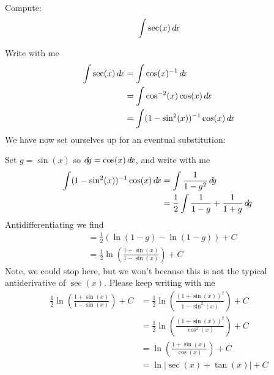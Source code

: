 \documentclass{ximera}
\begin{document}
\begin{example}
  Compute:
  \[
  \int \sec (x) \mathop{}\!d\! x
  \]
  \begin{explanation}
    Write with me
    \begin{align*}
      \int \sec(x) \d x &= \int \cos(x)^{-1} \d x\\
      &= \int \cos^{-2}(x)\cos(x) \d x\\
      &=\int(1-\sin^2(x))^{-1} \cos(x) \d x
    \end{align*}
    We have now set ourselves up for an eventual substitution:
    \begin{center}%
    \end{center}
    Set $g =\sin(x)$ so $\mathop{}\!d\! g = \cos(x) \mathop{}\!d\! x$, and write with me
    \begin{align*}
      \int(1-\sin^2(x))^{-1} \cos(x) \mathop{}\!d\! x &= \int \frac{1}{1-g^2}\mathop{}\!d\! g\\
      &= \frac{1}{2}\int \frac{1}{1-g} + \frac{1}{1+g} \mathop{}\!d\! g\
    \end{align*}
    Antidifferentiating we find
    \begin{align*}
      &=\frac{1}{2}\left(\ln(1-g) - \ln(1-g)\right)+C\\
      &= \frac{1}{2}\ln\left(\frac{1+\sin(x)}{1-\sin(x)}\right)+C
    \end{align*}
    Note, we could stop here, but we won't because this is not the
    typical antiderivative of $\sec(x)$. Please keep writing with me
    \begin{align*}
      \frac{1}{2}\ln\left(\frac{1+\sin(x)}{1-\sin(x)}\right)+C &= \frac{1}{2}\ln\left(\frac{(1+\sin(x))^2}{1-\sin^2(x)}\right)+C \\
      &= \frac{1}{2}\ln\left(\frac{(1+\sin(x))^2}{\cos^2(x)}\right)+C \\
      &= \ln\left(\frac{1+\sin(x)}{\cos(x)}\right)+C \\
      &= \ln\left|\sec(x) + \tan(x)\right|+C \\
    \end{align*}
  \end{explanation}
\end{example}
\end{document}
